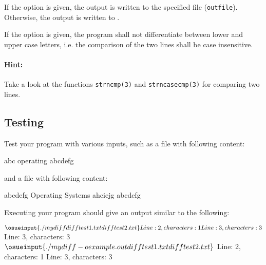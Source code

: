 If the option  is given,
the output is written to the specified file (\verb|outfile|).
Otherwise, the output is written to .

If the option  is given,
the program shall not differentiate between lower and upper case letters,
i.e. the comparison of the two lines shall be case insensitive.

\paragraph*{Hint:}
Take a look at the functions \verb|strncmp(3)| and \verb|strncasecmp(3)|
for comparing two lines.

\subsection*{Testing}

Test your program with various inputs,
such as a file  with following content:

\begin{osuefmtcode}
      abc
      operating
      abcdefg
\end{osuefmtcode}

and a file  with following content:

\begin{osuefmtcode}
      abcdefg
      Operating Systems
      ahciejg
      abcdefg
\end{osuefmtcode}

Executing your program should give an output similar to the following:

\begin{osuefmtcode}
    $ \osueinput{./mydiff difftest1.txt difftest2.txt}
    Line: 2, characters: 1
    Line: 3, characters: 3
    $ 
    Line: 3, characters: 3
    $ \osueinput{./mydiff -o example.out difftest1.txt difftest2.txt}
    $ 
    Line: 2, characters: 1
    Line: 3, characters: 3
\end{osuefmtcode}

\osueguidelinesone


